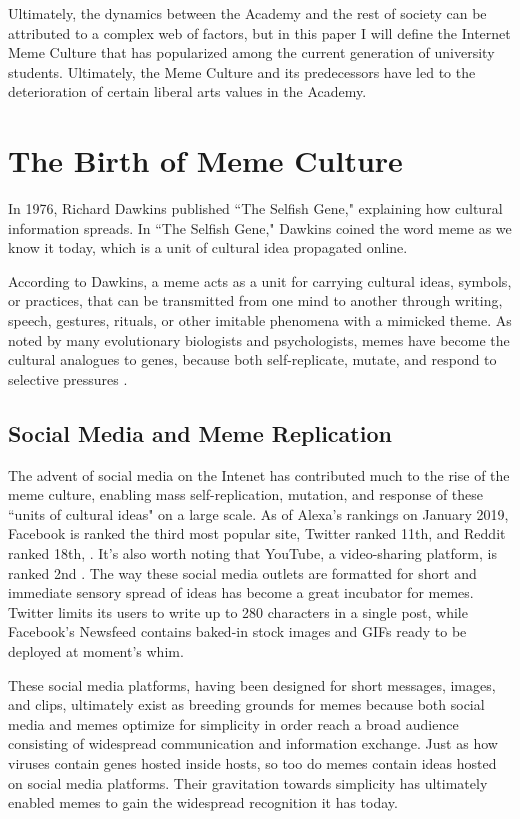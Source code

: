 \documentclass[12pt,letterpaper]{article}
\begin{document}
Ultimately, the dynamics between the Academy and the rest of society can be attributed to a complex web of factors, but in this paper I will define the Internet Meme Culture that has popularized among the current generation of university students.  Ultimately, the Meme Culture and its predecessors have led to the deterioration of certain liberal arts values in the Academy.

\section{The Birth of Meme Culture}

In 1976, Richard Dawkins published ``The Selfish Gene," explaining how cultural information spreads.  In ``The Selfish Gene," Dawkins coined the word meme as we know it today, which is a unit of cultural idea propagated online.

According to Dawkins, a meme acts as a unit for carrying cultural ideas, symbols, or practices, that can be transmitted from one mind to another through writing, speech, gestures, rituals, or other imitable phenomena with a mimicked theme\cite{}.  As noted by many evolutionary biologists and psychologists, memes have become the cultural analogues to genes, because both self-replicate, mutate, and respond to selective pressures \cite{}.

\subsection{Social Media and Meme Replication}
The advent of social media on the Intenet has contributed much to the rise of the meme culture, enabling mass self-replication, mutation, and response of these ``units of cultural ideas" on a large scale.  As of Alexa's rankings on January 2019, Facebook is ranked the third most popular site, Twitter ranked 11th, and Reddit ranked 18th, \cite{}.  It's also worth noting that YouTube, a video-sharing platform, is ranked 2nd \cite{}.  The way these social media outlets are formatted for short and immediate sensory spread of ideas has become a great incubator for memes.  Twitter limits its users to write up to 280 characters in a single post, while Facebook's Newsfeed contains baked-in stock images and GIFs ready to be deployed at moment's whim.

These social media platforms, having been designed for short messages, images, and clips, ultimately exist as breeding grounds for memes because both social media and memes optimize for simplicity in order reach a broad audience consisting of widespread communication and information exchange.  Just as how viruses contain genes hosted inside hosts, so too do memes contain ideas hosted on social media platforms.  Their gravitation towards simplicity has ultimately enabled memes to gain the widespread recognition it has today.
\end{document}

